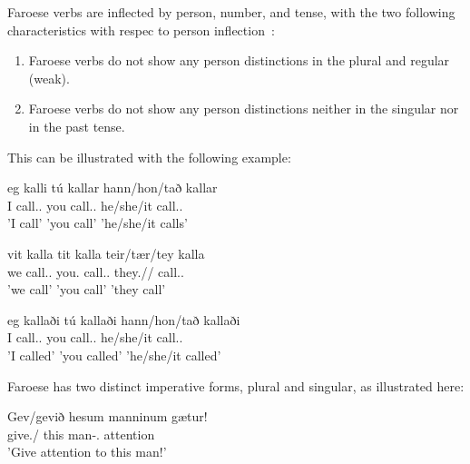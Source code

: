 \documentclass[12pt,%
]{lin-v2/lin}
\begin{document}
Faroese verbs are inflected by person, number, and tense, with the two following characteristics with respec to
person inflection~\citep[67]{faroese}:
\begin{enumerate}
    \item Faroese verbs do not show any person distinctions in the plural and regular (weak).
    \item Faroese verbs do not show any person distinctions neither in the singular nor in the past tense.
\end{enumerate}

This can be illustrated with the following example:
\begin{exe}
    \ex
    \begin{xlist}
        \item \gll eg kalli tú kallar hann/hon/tað kallar\\
        I call.\First\Sg.\Prs{} you call.\Second\Sg.\Prs{} he/she/it call.\Third\Sg.\Prs\\
        \trans 'I call' 'you call' 'he/she/it calls'
        \item \gll vit kalla tit kalla teir/tær/tey kalla\\
        we call.\First\Pl.\Prs{} you.\Pl{} call.\Second\Pl.\Prs{} they.\M/\F/\N{} call.\Third\Pl.\Prs\\
        \trans 'we call' 'you call' 'they call'
        \item \gll eg kallaði tú kallaði hann/hon/tað kallaði\\
        I call.\First\Sg.\Pst{} you call.\Second\Sg.\Pst{} he/she/it call.\Third\Sg.\Pst\\
        \trans 'I called' 'you called' 'he/she/it called'
    \end{xlist}
\end{exe}

Faroese has two distinct imperative forms, plural and singular, as illustrated here:
\begin{exe}
    \ex
    \gll Gev/gevið hesum manninum gætur!\\
    give.\Sg/\Pl{} this man-\Det.\Third\Sg\Dat{} attention\\
    \trans 'Give attention to this man!'
\end{exe}
\end{document}
